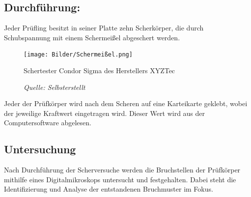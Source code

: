\subsection{Durchführung:}
Jeder Prüfling besitzt in seiner Platte zehn Scherkörper, die durch Schubspannung mit einem Schermeißel abgeschert werden.
\vspace{0.1cm}
\begin{figure}[h]
    \centering
    \texttt{[image: Bilder/Schermeißel.png]}
    \caption{Schertester Condor Sigma des Herstellers XYZTec}
    \caption*{\textit{Quelle: Selbsterstellt}}
    \vspace{0.2cm}
    \label{Abb.4: Schertester Condor Sigma des Herstellers XYZTec}
\end{figure}
\vspace{0.1cm}
Jeder der Prüfkörper wird nach dem Scheren auf eine Karteikarte geklebt, wobei der jeweilige Kraftwert eingetragen wird.
Dieser Wert wird aus der Computersoftware abgelesen.
\subsection{Untersuchung}
Nach Durchführung der Scherversuche werden die Bruchstellen der Prüfkörper mithilfe eines Digitalmikroskops untersucht und festgehalten.
Dabei steht die Identifizierung und Analyse der entstandenen Bruchmuster im Fokus. 